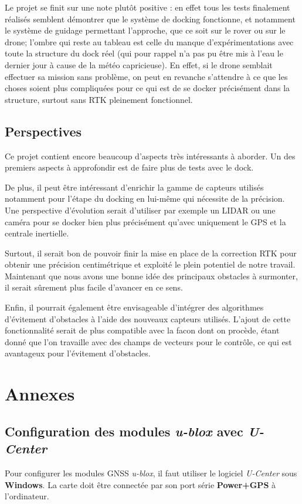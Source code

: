 \documentclass[12pt]{report}
\begin{document}
Le projet se finit sur une note plutôt positive : en effet tous les tests finalement réalisés semblent démontrer que le système de docking fonctionne, et notamment le système de guidage permettant l'approche, que ce soit sur le rover ou sur le drone; l'ombre qui reste au tableau est celle du manque d'expérimentations avec toute la structure du dock réel (qui pour rappel n'a pas pu être mis à l'eau le dernier jour à cause de la météo capricieuse). En effet, si le drone semblait effectuer sa mission sans problème, on peut en revanche s'attendre à ce que les choses soient plus compliquées pour ce qui est de se docker précisément dans la structure, surtout sans RTK pleinement fonctionnel.

\section{Perspectives}
Ce projet contient encore beaucoup d'aspects très intéressants à aborder. Un des premiers aspects à
approfondir est de faire plus de tests avec le dock.

De plus, il peut être intéressant d'enrichir la gamme de capteurs utilisés notamment pour l'étape du
docking en lui-même qui nécessite de la précision. Une perspective d'évolution serait d'utiliser par
exemple un LIDAR ou une caméra pour se docker bien plus précisément qu'avec uniquement le GPS et la
centrale inertielle.

Surtout, il serait bon de pouvoir finir la mise en place de la correction RTK pour obtenir une précision centimétrique et exploité le plein potentiel de notre travail.
Maintenant que nous avons une bonne idée des principaux obstacles à surmonter, il serait sûrement plus facile d'avancer en ce sens.

Enfin, il pourrait également être envisageable d'intégrer des algorithmes d'évitement d'obstacles à
l'aide des nouveaux capteurs utilisés. L'ajout de cette fonctionnalité serait de plus compatible avec la
facon dont on procède, étant donné que l'on travaille avec des champs de vecteurs pour le contrôle, ce
qui est avantageux pour l'évitement d'obstacles.

\chapter{Annexes}
\section{Configuration des modules \textit{u-blox} avec \textit{U-Center}}
Pour configurer les modules GNSS \textit{u-blox}, il faut utiliser le logiciel \textit{U-Center} sous \textbf{Windows}. La carte doit être connectée par son port série \textbf{Power+GPS} à l'ordinateur.
\end{document}
